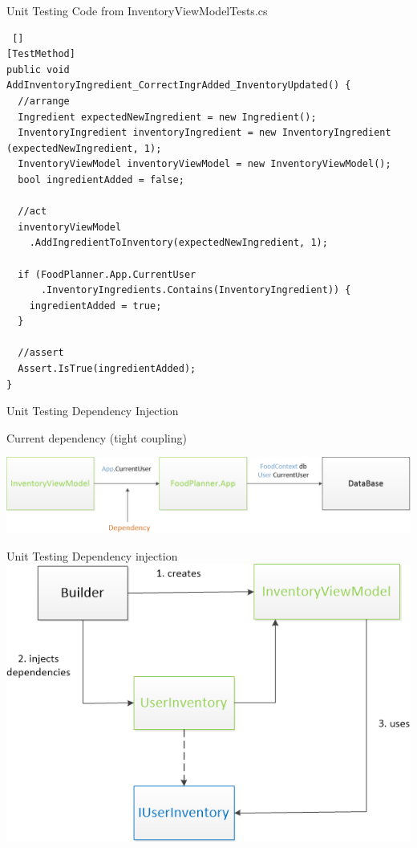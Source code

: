 \begin{frame} [fragile] {Unit Testing} {Code from InventoryViewModelTests.cs}

\begin{lstlisting} []
[TestMethod]
public void
AddInventoryIngredient_CorrectIngrAdded_InventoryUpdated() {
  //arrange
  Ingredient expectedNewIngredient = new Ingredient();
  InventoryIngredient inventoryIngredient = new InventoryIngredient (expectedNewIngredient, 1);
  InventoryViewModel inventoryViewModel = new InventoryViewModel();
  bool ingredientAdded = false;
  
  //act
  inventoryViewModel
    .AddIngredientToInventory(expectedNewIngredient, 1);
  
  if (FoodPlanner.App.CurrentUser
      .InventoryIngredients.Contains(InventoryIngredient)) {
    ingredientAdded = true;
  }
    
  //assert
  Assert.IsTrue(ingredientAdded);
}
\end{lstlisting}

\end{frame}

\begin{frame} {Unit Testing} {Dependency Injection}

Current dependency (tight coupling) \newline

\includegraphics[width = \textwidth] {graphics/currentDependency.png}
\end{frame}

\begin{frame} {Unit Testing} {Dependency injection}
\includegraphics[width = \textwidth]{graphics/dependencyInjectionBasic.png}
\end{frame}


